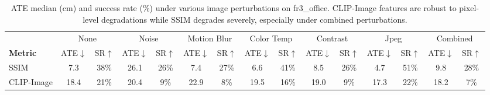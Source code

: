 \begin{table}[t]
\centering
\small
\setlength{\tabcolsep}{4pt}
\begin{tabular}{@{}lcccccccccccccc@{}}
\toprule
& \multicolumn{2}{c}{None} & \multicolumn{2}{c}{Noise} & \multicolumn{2}{c}{Motion Blur} & \multicolumn{2}{c}{Color Temp} & \multicolumn{2}{c}{Contrast} & \multicolumn{2}{c}{Jpeg} & \multicolumn{2}{c}{Combined} \\
\cmidrule(lr){2-3} \cmidrule(lr){4-5} \cmidrule(lr){6-7} \cmidrule(lr){8-9} \cmidrule(lr){10-11} \cmidrule(lr){12-13} \cmidrule(lr){14-15}
\textbf{Metric} & ATE$\downarrow$ & SR$\uparrow$ & ATE$\downarrow$ & SR$\uparrow$ & ATE$\downarrow$ & SR$\uparrow$ & ATE$\downarrow$ & SR$\uparrow$ & ATE$\downarrow$ & SR$\uparrow$ & ATE$\downarrow$ & SR$\uparrow$ & ATE$\downarrow$ & SR$\uparrow$ \\
\midrule
  SSIM & 7.3 & 38\% & 26.1 & 26\% & 7.4 & 27\% & 6.6 & 41\% & 8.5 & 26\% & 4.7 & 51\% & 9.8 & 28\% \\
  CLIP-Image & 18.4 & 21\% & 20.4 & 9\% & 22.9 & 8\% & 19.5 & 16\% & 19.0 & 9\% & 17.3 & 22\% & 18.2 & 7\% \\
\bottomrule
\end{tabular}
\caption{ATE median (cm) and success rate (\%) under various image perturbations on fr3\_office. CLIP-Image features are robust to pixel-level degradations while SSIM degrades severely, especially under combined perturbations.}
\label{tab:perturbation_robustness}
\end{table}